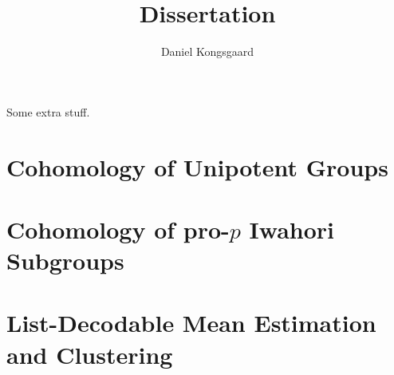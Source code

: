 \documentclass[letterpaper,oneside,english,11pt,openany]{memoir}
\title{Dissertation}
\author{Daniel Kongsgaard}
\begin{document}
\DoubleSpacing


\frontmatter



\tableofcontents*

\clearpage

\begin{vplace}[0.7]
  Some extra stuff.
\end{vplace}

\clearpage

\mainmatter

\chapter{Cohomology of Unipotent Groups}%
\label{cha:cohunigps}



\chapter{Cohomology of pro-\texorpdfstring{$p$}{p} Iwahori Subgroups}%
\label{cha:cohiwagps}



\chapter{List-Decodable Mean Estimation and Clustering}%
\label{cha:robstat}



\clearpage

\backmatter

\printbibliography

\clearpage

\printnomenclature[4cm]

\clearpage

\printindex
\end{document}
